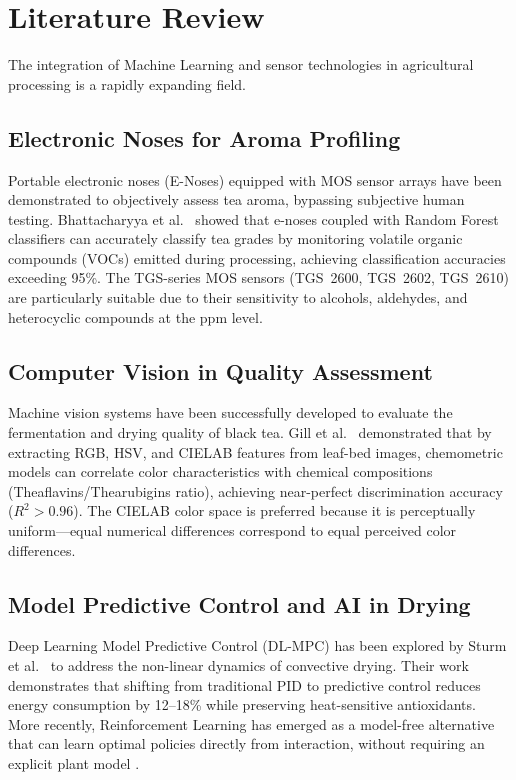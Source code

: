 ﻿\documentclass[12pt, a4paper]{report}
\begin{document}
\chapter{Literature Review}
The integration of Machine Learning and sensor technologies in agricultural processing is a rapidly expanding field.

\section{Electronic Noses for Aroma Profiling}
Portable electronic noses (E-Noses) equipped with MOS sensor arrays have been demonstrated to objectively assess tea aroma, bypassing subjective human testing. Bhattacharyya et al.\ \cite{ref_enose} showed that e-noses coupled with Random Forest classifiers can accurately classify tea grades by monitoring volatile organic compounds (VOCs) emitted during processing, achieving classification accuracies exceeding 95\%. The TGS-series MOS sensors (TGS~2600, TGS~2602, TGS~2610) are particularly suitable due to their sensitivity to alcohols, aldehydes, and heterocyclic compounds at the ppm level.

\section{Computer Vision in Quality Assessment}
Machine vision systems have been successfully developed to evaluate the fermentation and drying quality of black tea. Gill et al.\ \cite{ref_vision} demonstrated that by extracting RGB, HSV, and CIELAB features from leaf-bed images, chemometric models can correlate color characteristics with chemical compositions (Theaflavins/Thearubigins ratio), achieving near-perfect discrimination accuracy ($R^2 > 0.96$). The CIELAB color space is preferred because it is perceptually uniform---equal numerical differences correspond to equal perceived color differences.

\section{Model Predictive Control and AI in Drying}
Deep Learning Model Predictive Control (DL-MPC) has been explored by Sturm et al.\ \cite{ref_mpc} to address the non-linear dynamics of convective drying. Their work demonstrates that shifting from traditional PID to predictive control reduces energy consumption by 12--18\% while preserving heat-sensitive antioxidants. More recently, Reinforcement Learning has emerged as a model-free alternative that can learn optimal policies directly from interaction, without requiring an explicit plant model \cite{ref_rl_control}.
\end{document}
